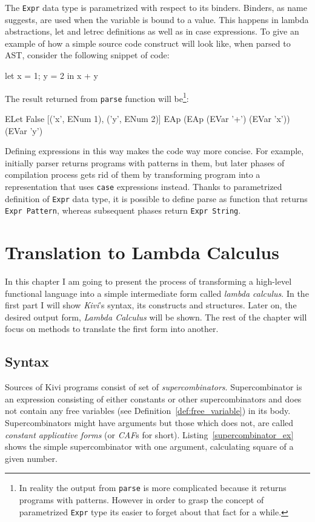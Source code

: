 \documentclass[12pt,a4paper]{report}
\begin{document}
The \texttt{Expr} data type is parametrized with respect to its binders.
Binders, as name suggests, are used when the variable is bound to a value. This
happens in lambda abstractions, let and letrec definitions as well as in
case expressions. To give an example of how a simple source code
construct will look like, when parsed to AST, consider the following
snippet of code:

\vspace*{0.2in}
\begin{code}
let
    x = 1;
    y = 2
in
    x + y
\end{code}

The result returned from \texttt{parse} function will be\footnote{In reality
the output from \texttt{parse} is more complicated because it returns programs
with patterns. However in order to grasp the concept of parametrized
\texttt{Expr} type its easier to forget about that fact for a while.}:

\vspace*{0.2in}
\begin{code}
  ELet False
       [('x', ENum 1), ('y', ENum 2)]
       EAp (EAp (EVar '+') (EVar 'x')) (EVar 'y')
\end{code}

Defining expressions in this way makes the code way more concise. For example,
initially parser returns programs with patterns in them, but later phases of
compilation process gets rid of them by transforming program into a
representation that uses \texttt{case} expressions instead. Thanks to
parametrized definition of \texttt{Expr} data type, it is possible to define
parse as function that returns \texttt{Expr Pattern}, whereas subsequent phases
return \texttt{Expr String}.


\chapter{Translation to Lambda Calculus}

In this chapter I am going to present the process of transforming a high-level
functional language into a simple intermediate form called \textit{lambda calculus}.
In the first part I will show \textit{Kivi}'s syntax, its constructs and
structures. Later on, the desired output form, \textit{Lambda Calculus} will be
shown. The rest of the chapter will focus on methods to translate the first form
into another.

\section{Syntax}
Sources of Kivi programs consist of set of
\textit{supercombinators}\cite{wiki:supercombinator}. Supercombinator is an
expression consisting of either constants or other supercombinators and does
not contain any free variables (see Definition~\ref{def:free_variable}) in its
body. Supercombinators might have arguments but those which does not, are
called \textit{constant applicative forms} (or \textit{CAF}s for short).
Listing~\ref{supercombinator_ex} shows the simple supercombinator with one
argument, calculating square of a given number.
\end{document}
